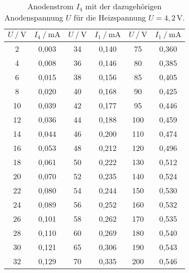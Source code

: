 \begin{table}[H]
    \centering
    \caption{Anodenstrom $I_4$ mit der dazugehörigen Anodenspannung $U$ für die Heizspannung $U = 4,2 \, \unit{\volt} $.}
    \label{tab:kennlini1_4}
    \begin{tabular}{S S S S S[table-format=3.1] S}
      \toprule
      {$U \mathbin{/} \unit{\volt}$} & {$I_4 \mathbin{/} \unit{\milli\ampere}$} & {$U \mathbin{/} \unit{\volt}$} & {$I_1 \mathbin{/} \unit{\milli\ampere}$} & {$U \mathbin{/} \unit{\volt}$} & {$I_1 \mathbin{/} \unit{\milli\ampere}$}  \\
      \midrule
        {2}  &     {0,003}       & {34}  &    {0,140} & {75 }    & {0,360} \\
        {4}  &     {0,008}       & {36}  &    {0,146} & {80 }    & {0,385} \\
        {6}  &     {0,015}       & {38}  &    {0,156} & {85 }    & {0,405} \\
        {8}  &     {0,020}       & {40}  &    {0,168} & {90 }    & {0,425} \\
        {10}  &    {0,039}       & {42}  &    {0,177} & {95 }    & {0,446} \\
        {12}  &    {0,036}       & {44}  &    {0,188} & {100}    & {0,459} \\
        {14}  &    {0,044}       & {46}  &    {0,200} & {110}    & {0,474} \\
        {16}  &    {0,053}       & {48}  &    {0,212} & {120}    & {0,496} \\
        {18}  &    {0,061}       & {50}  &    {0,222} & {130}    & {0,512} \\
        {20}  &    {0,070}       & {52}  &    {0,235} & {140}    & {0,524} \\
        {22}  &    {0,080}       & {54}  &    {0,244} & {150}    & {0,530} \\
        {24}  &    {0,089}       & {56}  &    {0,252} & {160}    & {0,532} \\
        {26}  &    {0,101}       & {58}  &    {0,262} & {170}    & {0,535} \\
        {28}  &    {0,110}       & {60}  &    {0,269} & {180}    & {0,540} \\
        {30}  &    {0,121}       & {65}  &    {0,306} & {190}    & {0,543} \\
        {32}  &    {0,129}       & {70}  &    {0,335} & {200}    & {0,546} \\
      \bottomrule
    \end{tabular}
\end{table}

